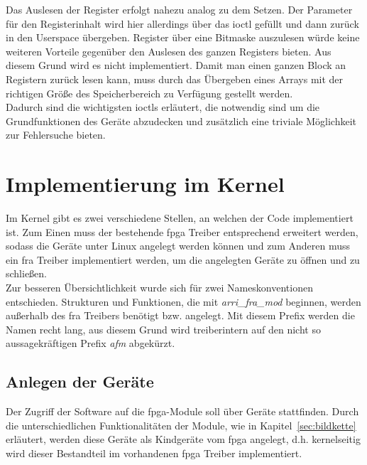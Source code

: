 Das Auslesen der Register erfolgt nahezu analog zu dem Setzen. Der Parameter für den Registerinhalt wird hier allerdings über das \ac{ioctl} gefüllt und dann zurück in den Userspace übergeben. 
Register über eine Bitmaske auszulesen würde keine weiteren Vorteile gegenüber den Auslesen des ganzen Registers bieten. Aus diesem Grund wird es nicht implementiert.  
Damit man einen ganzen Block an Registern zurück lesen kann, muss durch das Übergeben eines Arrays mit der richtigen Größe des Speicherbereich zu Verfügung gestellt werden.\\

Dadurch sind die wichtigsten \ac{ioctl}s erläutert, die notwendig sind um die Grundfunktionen des Geräte abzudecken und zusätzlich eine triviale Möglichkeit zur Fehlersuche bieten.

\section{Implementierung im Kernel}\label{sec:kernel}
Im Kernel gibt es zwei verschiedene Stellen, an welchen der Code implementiert ist. Zum Einen muss der bestehende \ac{fpga} Treiber entsprechend erweitert werden, sodass die Geräte unter Linux angelegt werden können und zum Anderen muss ein \ac{fra} Treiber implementiert werden, um die angelegten Geräte zu öffnen und zu schließen. \\

Zur besseren Übersichtlichkeit wurde sich für zwei Nameskonventionen entschieden. Strukturen und Funktionen, die mit \textit{arri\_fra\_mod} beginnen, werden außerhalb des \ac{fra} Treibers benötigt bzw. angelegt. Mit diesem Prefix werden die Namen recht lang, aus diesem Grund wird treiberintern auf den nicht so aussagekräftigen Prefix \textit{afm} abgekürzt.




\subsection{Anlegen der Geräte}
Der Zugriff der Software auf die \ac{fpga}-Module soll über Geräte stattfinden. Durch die unterschiedlichen Funktionalitäten der Module, wie in Kapitel~\ref{sec:bildkette} erläutert, werden diese Geräte als Kindgeräte vom \ac{fpga} angelegt, d.h. kernelseitig wird dieser Bestandteil im vorhandenen \ac{fpga} Treiber implementiert. 

